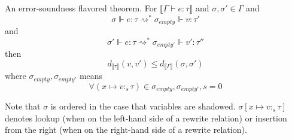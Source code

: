 An error-soundness flavored theorem. For $\llbracket \Gamma \vdash e : \tau
\rrbracket$ and $\sigma, \sigma' \in \Gamma$ and
$$\sigma \Vdash e : \tau \rightsquigarrow^* \sigma_{empty} \Vdash v : \tau'$$ 
and 
$$\sigma' \Vdash e : \tau \rightsquigarrow^* \sigma_{empty'} \Vdash v' : \tau''$$
then
$$
d_{\llbracket \tau \rrbracket}(v, v') \leq d_{\llbracket \Gamma \rrbracket}(\sigma, \sigma')
$$
where $\sigma_{empty}, \sigma_{empty'}$ means
$$
\forall (x \mapsto v :_s \tau) \in \sigma_{empty}, \sigma_{empty'}, s = 0
$$

Note that $\sigma$ is ordered in the case that variables are shadowed. $\sigma[x
\mapsto v :_s \tau]$ denotes lookup (when on the left-hand side of a rewrite
relation) or insertion from the right (when on the right-hand side of a rewrite
relation).

